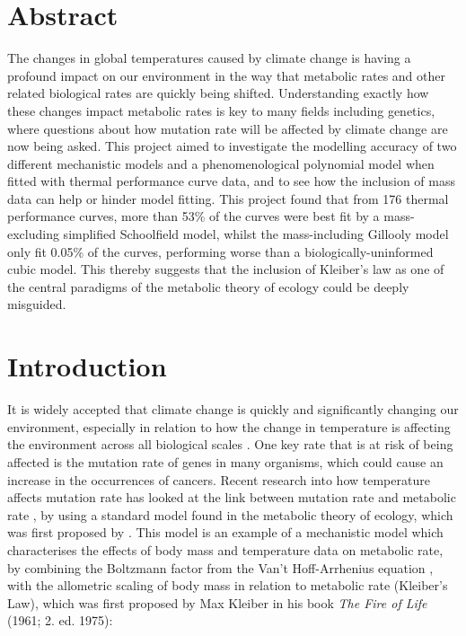 \documentclass[11pt]{article}
\begin{document}
\begin{linenumbers}
\section{Abstract}
The changes in global temperatures caused by climate change is having a profound impact on our environment in the way that metabolic rates and other related biological rates are quickly being shifted. Understanding exactly how these changes impact metabolic rates is key to many fields including genetics, where questions about how mutation rate will be affected by climate change are now being asked. This project aimed to investigate the modelling accuracy of two different mechanistic models and a phenomenological polynomial model when fitted with thermal performance curve data, and to see how the inclusion of mass data can help or hinder model fitting. This project found that from 176 thermal performance curves, more than 53\% of the curves were best fit by a mass-excluding simplified Schoolfield model, whilst the mass-including Gillooly model only fit 0.05\% of the curves, performing worse than a biologically-uninformed cubic model. This thereby suggests that the inclusion of Kleiber's law as one of the central paradigms of the metabolic theory of ecology could be deeply misguided.
\newpage
\section{Introduction}
It is widely accepted that climate change is quickly and significantly changing our environment, especially in relation to how the change in temperature is affecting the environment across all biological scales \citep{Houghton2001, Pawar2016}. One key rate that is at risk of being affected is the mutation rate of genes in many organisms, which could cause an increase in the occurrences of cancers. Recent research into how temperature affects mutation rate has looked at the link between mutation rate and metabolic rate \citep{Chu2018a}, by using a standard model found in the metabolic theory of ecology, which was first proposed by \citep{Gillooly2001, Savage2004, Niklas2001}.
This model is an example of a mechanistic model which characterises the effects of body mass and temperature data on metabolic rate, by combining the Boltzmann factor from the Van’t Hoff-Arrhenius equation \citep{Arrhenius1889}, with the allometric scaling of body mass in relation to metabolic rate (Kleiber's Law), which was first proposed by Max Kleiber in his book \textit{The Fire of Life} (1961; 2. ed. 1975):


\end{linenumbers}
\end{document}

